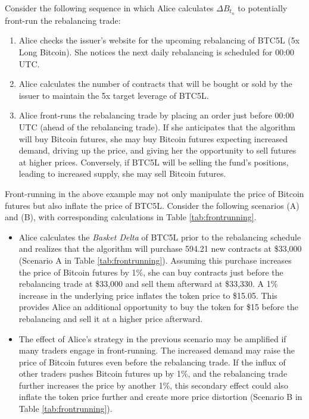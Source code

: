 \begin{example}
	Consider the following sequence in which Alice calculates $\Delta{B_{t_{n}}}$ to potentially front-run the rebalancing trade:
	
	\begin{enumerate}
		\item Alice checks the issuer's website for the upcoming rebalancing of BTC5L (5x Long Bitcoin). She notices the next daily rebalancing is scheduled for 00:00 UTC.
		\item Alice calculates the number of contracts that will be bought or sold by the issuer to maintain the 5x target leverage of BTC5L.
		\item Alice front-runs the rebalancing trade by placing an order just before 00:00 UTC (ahead of the rebalancing trade). If she anticipates that the algorithm will buy Bitcoin futures, she may buy Bitcoin futures expecting increased demand, driving up the price, and giving her the opportunity to sell futures at higher prices. Conversely, if BTC5L will be selling the fund's positions, leading to increased supply, she may sell Bitcoin futures.
	\end{enumerate}
	Front-running in the above example may not only manipulate the price of Bitcoin futures but also inflate the price of BTC5L. Consider the following scenarios (A) and (B), with corresponding calculations in Table \ref{tab:frontrunning}.
	
	\begin{itemize}
		\item Alice calculates the \textsl{Basket Delta} of BTC5L prior to the rebalancing schedule and realizes that the algorithm will purchase 594.21 new contracts at \$33,000 (Scenario A in Table \ref{tab:frontrunning}). Assuming this purchase increases the price of Bitcoin futures by 1\%, she can buy contracts just before the rebalancing trade at \$33,000 and sell them afterward at \$33,330. A 1\% increase in the underlying price inflates the token price to \$15.05. This provides Alice an additional opportunity to buy the token for \$15 before the rebalancing and sell it at a higher price afterward.
		
		\item The effect of Alice's strategy in the previous scenario may be amplified if many traders engage in front-running. The increased demand may raise the price of Bitcoin futures even before the rebalancing trade. If the influx of other traders pushes Bitcoin futures up by 1\%, and the rebalancing trade further increases the price by another 1\%, this secondary effect could also inflate the token price further and create more price distortion (Scenario B in Table \ref{tab:frontrunning}).
	\end{itemize}
\end{example}

